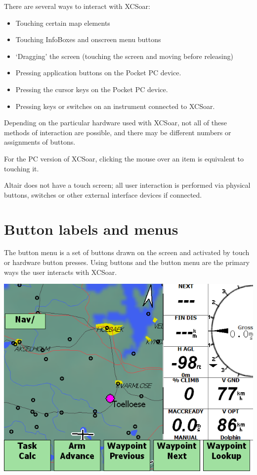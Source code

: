 \documentclass[a4paper,12pt]{refrep}
\begin{document}
There are several ways to interact with XCSoar:
\begin{itemize}
\item Touching certain map elements
\item Touching InfoBoxes and onscreen menu buttons
\item `Dragging' the screen (touching the screen and moving before releasing)
\item Pressing application buttons on the Pocket PC device.
\item Pressing the cursor keys on the Pocket PC device.
\item Pressing keys or switches on an instrument connected to XCSoar.
\end{itemize}
Depending on the particular hardware used with XCSoar, not all of
these methods of interaction are possible, and there may be different
numbers or assignments of buttons.  

For the PC version of XCSoar, clicking the mouse over an item is
equivalent to touching it.

Altair does not have a touch screen; all user interaction is performed
via physical buttons, switches or other external interface devices if
connected.

\section{Button labels and menus}
The button menu is a set of buttons drawn on the screen and activated
by touch or hardware button presses.  Using buttons and the button
menu are the primary ways the user interacts with XCSoar.  

\begin{center}
\includegraphics[angle=0,width=\linewidth,keepaspectratio='true']{figures/buttonmenu.png}
\end{center}
\end{document}
